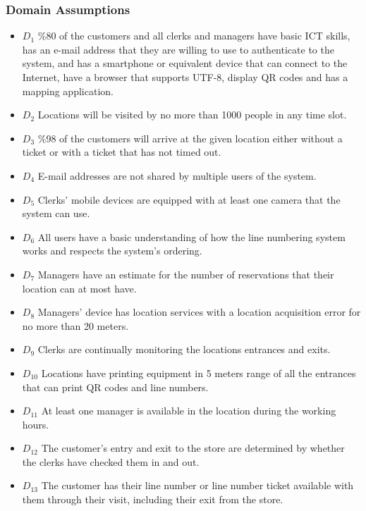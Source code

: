 \subsubsection{Domain Assumptions}

\begin{itemize}
    \item \textbf{$D_1$} \%80 of the customers and all clerks and managers have basic ICT skills, has an e-mail address that they are willing to use to authenticate to the system, and has a smartphone or equivalent device that can connect to the Internet, have a browser that supports UTF-8, display QR codes and has a mapping application.
    \item \textbf{$D_2$} Locations will be visited by no more than 1000 people in any time slot.
    \item \textbf{$D_3$} \%98 of the customers will arrive at the given location either without a ticket or with a ticket that has not timed out.
    \item \textbf{$D_4$} E-mail addresses are not shared by multiple users of the system.
    \item \textbf{$D_5$} Clerks' mobile devices are equipped with at least one camera that the system can use.
    \item \textbf{$D_6$} All users have a basic understanding of how the line numbering system works and respects the system's ordering.
    \item \textbf{$D_7$} Managers have an estimate for the number of reservations that their location can at most have.
    \item \textbf{$D_8$} Managers' device has location services with a location acquisition error for no more than 20 meters.
    \item \textbf{$D_9$} Clerks are continually monitoring the locations entrances and exits.
    \item \textbf{$D_{10}$} Locations have printing equipment in 5 meters range of all the entrances that can print QR codes and line numbers.
    \item \textbf{$D_{11}$} At least one manager is available in the location during the working hours.
    \item \textbf{$D_{12}$} The customer's entry and exit to the store are determined by whether the clerks have checked them in and out.
    \item \textbf{$D_{13}$} The customer has their line number or line number ticket available with them through their visit, including their exit from the store.
\end{itemize}

